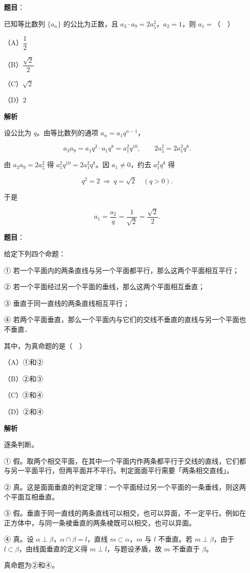 \begin{answer}

\textbf{题目}：

已知等比数列 $\{a_n\}$ 的公比为正数，且 $a_3\cdot a_9=2a_5^2$，$a_2=1$，则 $a_1=$（　）

（A）$\dfrac12$

（B）$\dfrac{\sqrt2}{2}$

（C）$\sqrt2$

（D）$2$

\textbf{解析}

设公比为 $q$。由等比数列的通项 $a_n=a_1q^{n-1}$，

\nopagebreak[4]
\[a_3a_9=a_1q^2\cdot a_1q^8=a_1^2q^{10},\qquad 2a_5^2=2a_1^2q^8.\]

由 $a_3a_9=2a_5^2$ 得 $a_1^2q^{10}=2a_1^2q^8$。因 $a_1\neq0$，约去 $a_1^2q^8$ 得

\nopagebreak[4]
\[q^2=2\ \Longrightarrow\ q=\sqrt2\quad(q>0).\]

于是

\nopagebreak[4]
\[a_1=\frac{a_2}{q}=\frac{1}{\sqrt2}=\frac{\sqrt2}{2}.\]


\end{answer}
\begin{answer}

\textbf{题目}：

给定下列四个命题：

① 若一个平面内的两条直线与另一个平面都平行，那么这两个平面相互平行；

② 若一个平面经过另一个平面的垂线，那么这两个平面相互垂直；

③ 垂直于同一直线的两条直线相互平行；

④ 若两个平面垂直，那么一个平面内与它们的交线不垂直的直线与另一个平面也不垂直．

其中，为真命题的是（　）

（A）①和②

（B）②和③

（C）③和④

（D）②和④

\textbf{解析}

逐条判断。

① 假。取两个相交平面，在其中一个平面内作两条都平行于交线的直线，它们都与另一平面平行，但两平面并不平行。判定面面平行需要「两条相交直线」。

② 真。这是面面垂直的判定定理：一个平面经过另一个平面的一条垂线，则这两个平面互相垂直。

③ 假。垂直于同一直线的两条直线可以相交，也可以异面，不一定平行。例如在正方体中，与同一条棱垂直的两条棱既可以相交，也可以异面。

④ 真。设 $\alpha\perp\beta$，$\alpha\cap\beta=l$，直线 $m\subset\alpha$，$m$ 与 $l$ 不垂直。若 $m\perp\beta$，由于 $l\subset\beta$，由线面垂直的定义得 $m\perp l$，与题设矛盾，故 $m$ 不垂直于 $\beta$。

真命题为②和④。


\end{answer}
